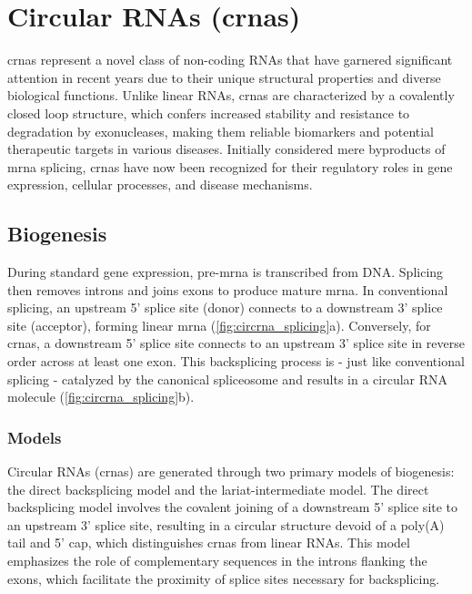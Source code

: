 \section{Circular RNAs (\gls{crna}s)}
\label{sec:circrnas}

\Gls{crna}s represent a novel class of non-coding RNAs that have garnered
significant attention in recent years due to their unique structural properties
and diverse biological functions.
Unlike linear RNAs, \gls{crna}s are characterized by a covalently closed loop
structure, which confers increased stability and resistance to degradation by
exonucleases, making them reliable biomarkers and potential therapeutic targets
in various
diseases\supercite{ma_circular_2020,hoque_exploring_2023,wilusz_circular_2017}.
Initially considered mere byproducts of \gls{mrna} splicing, \gls{crna}s have now
been recognized for their regulatory roles in gene expression, cellular
processes, and disease
mechanisms\supercite{cherubini_foxp1_2019,wilusz_360_2018}.

\subsection{Biogenesis}
\label{sec:circrna_biogenesis}
During standard gene expression, pre-\gls{mrna} is transcribed from DNA.
Splicing then removes introns and joins exons to produce mature
\gls{mrna}\supercite{black_mechanisms_2003}.
In conventional splicing, an upstream 5' splice site (donor) connects to a
downstream 3' splice site (acceptor), forming linear \gls{mrna}
(\cref{fig:circrna_splicing}a).
Conversely, for \gls{crna}s, a downstream 5' splice site connects to an
upstream 3' splice site in reverse order across at least one
exon\supercite{chen_expanding_2020}.
This backsplicing process is - just like conventional splicing - catalyzed by
the canonical spliceosome\supercite{starke_exon_2015} and results in a circular
RNA molecule (\cref{fig:circrna_splicing}b).

\subsubsection{Models}

Circular RNAs (\gls{crna}s) are generated through two primary models of
biogenesis: the direct backsplicing model and the lariat-intermediate model.
The direct backsplicing model involves the covalent joining of a downstream 5'
splice site to an upstream 3' splice site, resulting in a circular structure
devoid of a poly(A) tail and 5' cap, which distinguishes \gls{crna}s from
linear RNAs\supercite{zhang_complementary_2014,ferreira_circular_2018}.
This model emphasizes the role of complementary sequences in the introns
flanking the exons, which facilitate the proximity of splice sites necessary
for backsplicing\supercite{zhang_complementary_2014,meganck_engineering_2021}.

